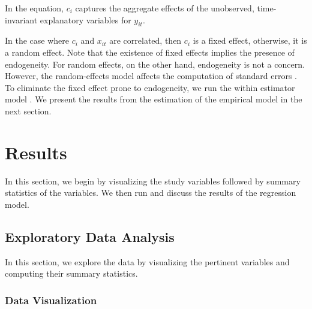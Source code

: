 \documentclass[a4paper, nobind]{templates/ociamthesis}
\begin{document}
In the equation, \(c_{i}\) captures the aggregate effects of the unobserved, time-invariant explanatory variables for \(y_{it}\).

In the case where \(c_{i}\) and \(x_{it}\) are correlated, then \(c_{i}\) is a fixed effect, otherwise, it is a random effect. Note that the existence of fixed effects implies the presence of endogeneity. For random effects, on the other hand, endogeneity is not a concern. However, the random-effects model affects the computation of standard errors \autocite{roberts2013endogeneity}. To eliminate the fixed effect prone to endogeneity, we run the within estimator model \autocite{clark2015should}. We present the results from the estimation of the empirical model in the next section.

\hypertarget{results}{%
\section{Results}\label{results}}

In this section, we begin by visualizing the study variables followed by summary statistics of the variables. We then run and discuss the results of the regression model.

\hypertarget{exploratory-data-analysis-1}{%
\subsection{Exploratory Data Analysis}\label{exploratory-data-analysis-1}}

In this section, we explore the data by visualizing the pertinent variables and computing their summary statistics.

\hypertarget{data-visualization}{%
\subsubsection{Data Visualization}\label{data-visualization}}
\end{document}
